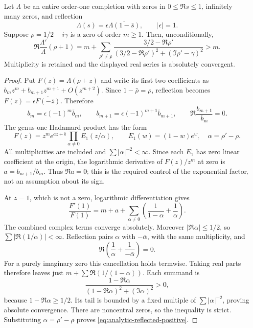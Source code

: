 \begin{lemma}
\label{lem:analytic-reflected-logderivative}
Let $\Lambda$ be an entire order-one completion with zeros in
$0\le\Re s\le1$, infinitely many zeros, and reflection
\[
 \Lambda(s)=\epsilon\overline{\Lambda(1-\bar s)},
 \qquad |\epsilon|=1.
\]
Suppose $\rho=1/2+i\gamma$ is a zero of order $m\ge1$.
Then, unconditionally,
\begin{equation}\label{eq:analytic-reflected-positive}
 \Re\frac{\Lambda'}{\Lambda}(\rho+1)
   =m+\sum_{\rho'\ne\rho}
       \frac{3/2-\Re\rho'}
       {(3/2-\Re\rho')^2+(\Im\rho'-\gamma)^2}>m.
\end{equation}
Multiplicity is retained and the displayed real series is
absolutely convergent.
\end{lemma}

\begin{proof}
Put $F(z)=\Lambda(\rho+z)$ and write its first two coefficients
as $b_mz^m+b_{m+1}z^{m+1}+O(z^{m+2})$. Since
$1-\bar\rho=\rho$, reflection becomes
$F(z)=\epsilon\overline{F(-\bar z)}$. Therefore
\[
 b_m=\epsilon(-1)^m\bar b_m,
 \qquad b_{m+1}=\epsilon(-1)^{m+1}\bar b_{m+1},
 \qquad
 \Re\frac{b_{m+1}}{b_m}=0.
\]
The genus-one Hadamard product has the form
\[
 F(z)=z^m e^{az+b}\prod_{\alpha\ne0}
           E_1(z/\alpha),\qquad
 E_1(w)=(1-w)e^w,
 \quad \alpha=\rho'-\rho.
\]
All multiplicities are included and
$\sum |\alpha|^{-2}<\infty$. Since each $E_1$ has zero
linear coefficient at the origin, the logarithmic derivative
of $F(z)/z^m$ at zero is $a=b_{m+1}/b_m$. Thus
$\Re a=0$; this is the required control of the exponential
factor, not an assumption about its sign.

At $z=1$, which is not a zero, logarithmic differentiation gives
\[
 \frac{F'(1)}{F(1)}=m+a+
     \sum_{\alpha\ne0}\left(\frac1{1-\alpha}
                                      +\frac1\alpha\right).
\]
The combined complex terms converge absolutely. Moreover
$|\Re\alpha|\le1/2$, so
$\sum|\Re(1/\alpha)|<\infty$. Reflection pairs $\alpha$ with
$-\bar\alpha$, with the same multiplicity, and
\[
 \Re\left(\frac1\alpha+\frac1{-\bar\alpha}\right)=0.
\]
For a purely imaginary zero this cancellation holds termwise.
Taking real parts therefore leaves just
$m+\sum\Re(1/(1-\alpha))$. Each summand is
\[
 \frac{1-\Re\alpha}
 {(1-\Re\alpha)^2+(\Im\alpha)^2}>0,
\]
because $1-\Re\alpha\ge1/2$. Its tail is bounded by a fixed
multiple of $\sum|\alpha|^{-2}$, proving absolute convergence.
There are noncentral zeros, so the inequality is strict.
Substituting $\alpha=\rho'-\rho$ proves
\eqref{eq:analytic-reflected-positive}.
\end{proof}

